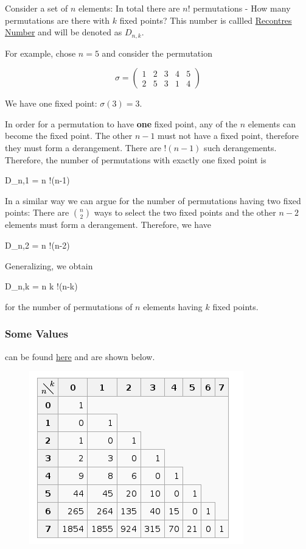 
Consider a set of $n$ elements: In total there are $n!$ permutations - How many permutations are there with $k$ fixed points? This number is callled \href{https://en.wikipedia.org/wiki/Rencontres_numbers}{Recontres Number} and will be denoted as $D_{n,k}$.

For example, chose $n=5$ and consider the permutation

\[
\sigma=\begin{pmatrix}
1 & 2 & 3 & 4 & 5 \\
2 & 5 & 3 & 1 & 4
\end{pmatrix}
\]

We have one fixed point: $\sigma(3) = 3$.

In order for a permutation to have \textbf{one} fixed point, any of the $n$ elements can become the fixed point. The other $n-1$ must not have a fixed point, therefore they must form a derangement. There are $!(n-1)$ such derangements. Therefore, the number of permutations with exactly one fixed point is

\bee
D_{n,1} = n !(n-1)
\eee

In a similar way we can argue for the number of permutations having two fixed points: There are $n \choose 2$ ways to select the two fixed points and the other $n-2$ elements must form a derangement.
Therefore, we have

\bee
D_{n,2} = {n } !(n-2)
\eee

Generalizing, we obtain

\be\label{2016-01-04:eq1}
D_{n,k} = {n \choose k} !(n-k)
\ee

for the number of permutations of $n$ elements having $k$ fixed points.

\subsubsection{Some Values}

can be found \href{https://en.wikipedia.org/wiki/Rencontres_numbers}{here} and are shown below.

\begin{figure}
\includegraphics{images/recontres_numbers.png}
\end{figure}

